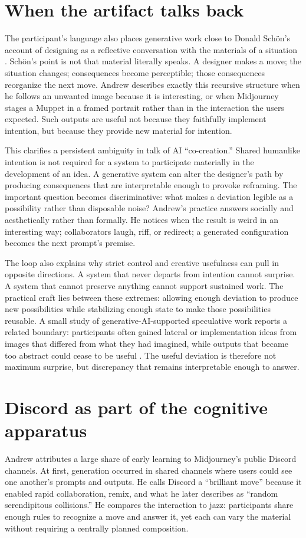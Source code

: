 \documentclass[11pt]{article}
\begin{document}
\section{When the artifact talks back}
The participant's language also places generative work close to Donald Schön's account of designing as a reflective conversation with the materials of a situation \citep{schon1992reflective}. Schön's point is not that material literally speaks. A designer makes a move; the situation changes; consequences become perceptible; those consequences reorganize the next move. Andrew describes exactly this recursive structure when he follows an unwanted image because it is interesting, or when Midjourney stages a Muppet in a framed portrait rather than in the interaction the users expected. Such outputs are useful not because they faithfully implement intention, but because they provide new material for intention.

This clarifies a persistent ambiguity in talk of AI ``co-creation.'' Shared humanlike intention is not required for a system to participate materially in the development of an idea. A generative system can alter the designer's path by producing consequences that are interpretable enough to provoke reframing. The important question becomes discriminative: what makes a deviation legible as a possibility rather than disposable noise? Andrew's practice answers socially and aesthetically rather than formally. He notices when the result is weird in an interesting way; collaborators laugh, riff, or redirect; a generated configuration becomes the next prompt's premise.

The loop also explains why strict control and creative usefulness can pull in opposite directions. A system that never departs from intention cannot surprise. A system that cannot preserve anything cannot support sustained work. The practical craft lies between these extremes: allowing enough deviation to produce new possibilities while stabilizing enough state to make those possibilities reusable. A small study of generative-AI-supported speculative work reports a related boundary: participants often gained lateral or implementation ideas from images that differed from what they had imagined, while outputs that became too abstract could cease to be useful \citep{epstein2022happy}. The useful deviation is therefore not maximum surprise, but discrepancy that remains interpretable enough to answer.

\section{Discord as part of the cognitive apparatus}
Andrew attributes a large share of early learning to Midjourney's public Discord channels. At first, generation occurred in shared channels where users could see one another's prompts and outputs. He calls Discord a ``brilliant move'' because it enabled rapid collaboration, remix, and what he later describes as ``random serendipitous collisions.'' He compares the interaction to jazz: participants share enough rules to recognize a move and answer it, yet each can vary the material without requiring a centrally planned composition.
\end{document}
